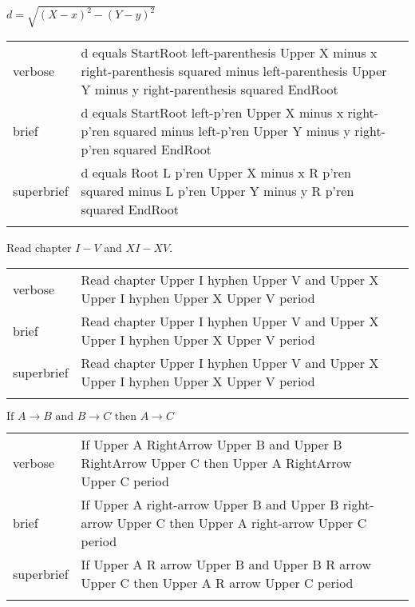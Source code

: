 \label{sec:cap}

\R
\E $d=\sqrt{(X-x)^2-(Y-y)^2}$
\begin{longtable}[c]{@{}lll@{}}
\toprule\addlinespace
verbose & d equals StartRoot left-parenthesis Upper X minus x
right-parenthesis squared minus left-parenthesis Upper Y minus y
right-parenthesis squared EndRoot &

\\\addlinespace
brief & d equals StartRoot left-p'ren Upper X minus x right-p'ren
squared minus left-p'ren Upper Y minus y right-p'ren squared EndRoot &

\\\addlinespace
superbrief & d equals Root L p'ren Upper X minus x R p'ren squared minus
L p'ren Upper Y minus y R p'ren squared EndRoot &

\\\addlinespace
\bottomrule
\end{longtable}



\R
\E Read chapter $I-V$ and $XI-XV$.
\begin{longtable}[c]{@{}ll@{}}
\toprule\addlinespace
verbose & Read chapter Upper I hyphen Upper V and Upper X Upper I hyphen
Upper X Upper V period
\\\addlinespace
brief & Read chapter Upper I hyphen Upper V and Upper X Upper I hyphen
Upper X Upper V period
\\\addlinespace
superbrief & Read chapter Upper I hyphen Upper V and Upper X Upper I
hyphen Upper X Upper V period
\\\addlinespace
\bottomrule
\end{longtable}


\R
\E $\mbox{If } A\to B \mbox{ and } B\to C \mbox{ then } A\to C$
\begin{longtable}[c]{@{}lll@{}}
\toprule\addlinespace
verbose & If Upper A RightArrow Upper B and Upper B RightArrow Upper C
then Upper A RightArrow Upper C period &

\\\addlinespace
brief & If Upper A right-arrow Upper B and Upper B right-arrow Upper C
then Upper A right-arrow Upper C period &

\\\addlinespace
superbrief & If Upper A R arrow Upper B and Upper B R arrow Upper C then
Upper A R arrow Upper C period &

\\\addlinespace
\bottomrule
\end{longtable}


